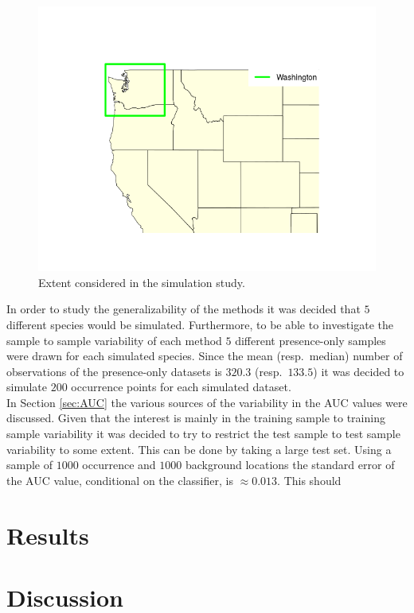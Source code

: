 \begin{figure}[!htb]
\center
\includegraphics[scale=0.5]{Plots/WashingtonPlot.png}
\caption{\label{fig:WashState}Extent considered in the simulation study.}
\end{figure}

In order to study the generalizability of the methods it was decided that $5$ different species would be simulated. Furthermore, to be able to investigate the sample to sample variability of each method $5$ different presence-only samples were drawn for each simulated species. Since the mean (resp.\ median) number of observations of the presence-only datasets is $320.3$ (resp.\ $133.5$) it was decided to simulate $200$ occurrence points for each simulated dataset. \\

In Section \ref{sec:AUC} the various sources of the variability in the AUC values were discussed. Given that the interest is mainly in the training sample to training sample variability it was decided to try to restrict the test sample to test sample variability to some extent. This can be done by taking a large test set. Using a sample of $1000$ occurrence and $1000$ background locations the standard error of the AUC value, conditional on the classifier, is $\approx 0.013$. This should 

\section{Results}

\section{Discussion}





